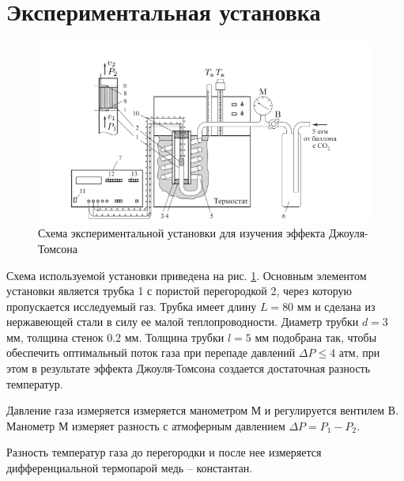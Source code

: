 \documentclass[12pt]{article}
\begin{document}
    \section{Экспериментальная установка}
    \begin{figure}[h]
        \centering
        \includegraphics[scale=3]{stand.png}
        \caption{Схема экспериментальной установки для изучения эффекта Джоуля-Томсона}
        \label{stand}
    \end{figure}
    Схема используемой установки приведена на рис. \ref{stand}. Основным
    элементом установки является трубка 1 с пористой перегородкой 2, через
    которую пропускается исследуемый газ. Трубка имеет длину $L = 80$ мм и
    сделана из нержавеющей стали в силу ее малой теплопроводности. Диаметр
    трубки $d = 3$ мм, толщина стенок 0.2 мм. Толщина трубки $l = 5$ мм 
    подобрана так, чтобы обеспечить оптимальный поток газа при перепаде
    давлений $\Delta P \le 4$ атм, при этом в результате эффекта Джоуля-Томсона
    создается достаточная разность температур. 
    \par Давление газа измеряется измеряется манометром М и регулируется 
    вентилем В. Манометр М измеряет разность с атмоферным давлением 
    $\Delta P = P_1 - P_2$.
    \par Разность температур газа до перегородки и после нее измеряется 
    дифференциальной термопарой медь -- константан.
\end{document}
